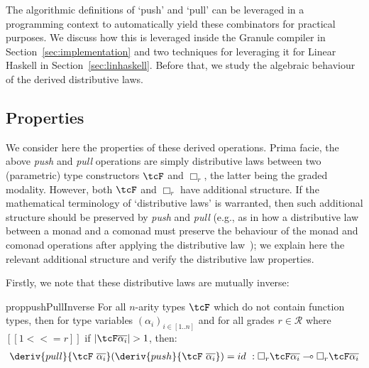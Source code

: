 The algorithmic definitions of `push' and `pull' can be leveraged
in a programming context to automatically yield these combinators for
practical purposes. We discuss how this is leveraged inside the
Granule compiler in Section~\ref{sec:implementation} and two techniques
for leveraging it for Linear Haskell in Section~\ref{sec:linhaskell}.
Before that, we study the algebraic behaviour of the derived distributive laws.

\subsection{Properties}
\label{subsection:properties}


We consider here the properties of these derived operations.  Prima
facie, the above \emph{push} and \emph{pull} operations are simply
distributive laws between two (parametric) type constructors $\tcF$
and $\Box_r$, the latter being the graded modality. However, both
$\tcF$ and $\Box_r$ have additional structure. If the mathematical
terminology of `distributive laws' is warranted, then such additional structure
should be preserved by \emph{push} and \emph{pull} (e.g., as in how
a distributive law between a monad and a comonad must preserve
the behaviour of the monad and comonad operations after applying
the distributive law~\cite{power2002combining}); we explain here the relevant
additional structure and verify the distributive law properties.

Firstly, we note that these distributive laws are mutually inverse:

\begin{restatable}{prop}{pushPullInverse}
  For all $n$-arity types $\tcF$ which do not contain function types,
  then for type variables $(\alpha_i)_{i \in [1..n]}$
  and for all grades $r \in \mathcal{R}$ where $[[1 <<= r]]$ if $|\tcF
    \overline{\alpha_i}| > 1$, then:
  \begin{align*}
\deriv{pull}{\tcF\
  \overline{\alpha_i}}(\deriv{push}{\tcF\
  \overline{\alpha_i}}) = id\ : \Box_{r} \tcF \overline{\alpha_i}
\multimap \Box_{r} \tcF \overline{\alpha_i}
    \end{align*}
\end{restatable}


